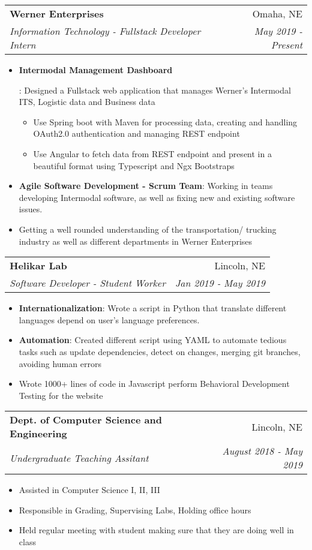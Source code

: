 \documentclass[letterpaper,10pt]{article}
\makeatletter
\newcommand{\resumeItem}[2]{
  \item\small{
    \textbf{#1}{: #2 \vspace{-2pt}}
  }
}
\newcommand{\resumeSubheading}[4]{
  \vspace{-1pt}\item[]
  \begin{tabular*}{0.98\textwidth}{l@{\extracolsep{\fill}}r}
      \hspace{-10pt}\textbf{#1} & #2 \\
      \hspace{-10pt}\textit{\small#3} & \textit{\small #4} \\
    \end{tabular*}\vspace{-5pt}
}
\newcommand{\resumeItemListStart}{\begin{itemize}}
\newcommand{\resumeItemListEnd}{\end{itemize}\vspace{-5pt}}
\makeatother
\begin{document}
    \resumeSubheading
      {Werner Enterprises}{Omaha, NE}
      {Information Technology - Fullstack Developer Intern}{May 2019 - Present}
      \resumeItemListStart
        \resumeItem{Intermodal Management Dashboard}
          {Designed a Fullstack web application that manages Werner's Intermodal ITS, Logistic data and Business data
            \begin{itemize}
               
                \item Use Spring boot with Maven for processing data, creating and handling OAuth2.0 authentication and managing REST endpoint
                \item Use Angular to fetch data from REST endpoint and present in a beautiful format using Typescript and Ngx Bootstraps
                
            \end{itemize}
          }
        \resumeItem{Agile Software Development - Scrum Team}
          { Working in teams developing Intermodal software, as well as fixing new and existing software issues. }
        \small \item
          {Getting a well rounded understanding of the transportation/ trucking industry as well as different departments in Werner Enterprises
          }
          
      \resumeItemListEnd


    \resumeSubheading
      {Helikar Lab}{Lincoln, NE}
      {Software Developer - Student Worker}{Jan 2019 - May 2019}
      \resumeItemListStart
        \resumeItem{Internationalization}
            {Wrote a script in Python that translate different languages depend on user's language preferences.}
        \resumeItem{Automation}
            {Created different script using YAML to automate tedious tasks such as update dependencies, detect on changes, merging git branches, avoiding human errors}
            \small \item Wrote 1000+ lines of code in Javascript perform Behavioral Development Testing for the website
      \resumeItemListEnd
      
    \resumeSubheading
      {Dept. of Computer Science and Engineering}{Lincoln, NE}
      {Undergraduate Teaching Assitant}{August 2018 - May 2019}
      \resumeItemListStart
        \small
            \item Assisted in Computer Science I, II, III
            \item Responsible in Grading, Supervising Labs, Holding office hours
            \item Held regular meeting with student making sure that they are doing well in class
      \resumeItemListEnd
\end{document}
